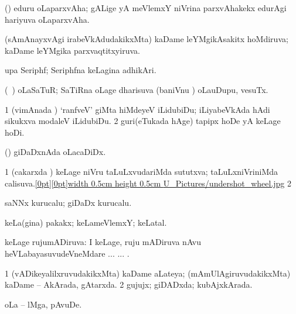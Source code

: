 {\bentry
{} 
\gl{\nA}
\expl{}
\bmng
 (\nw) eduru oLaparxvAha; gALige yA meVlemxY niVrina parxvAhakekx edurAgi hariyuva oLaparxvAha. 
\emng
\eentry

\bentry
{} 
\gl{\gu}
\expl{}
\bmng
 (sAmAnayxvAgi irabeVkAdudakikxMta) kaDame leYMgikAsakitx hoMdiruva; kaDame leYMgika parxvaqtitxyiruva. 
\emng
\eentry

\bentry
{} 
\gl{\nA}
\expl{}
\bmng
 upa Seriphf; Seriphfna keLagina adhikAri. 
\emng
\eentry

\bentry
{} 
\gl{\gu}
\expl{}
\bmng
 (\kanmu\ \ame) oLaSaTuR; SaTiRna oLage dharisuva (baniVnu \mo) oLauDupu, vesuTx. 
\emng
\eentry

\bentry
{} 
\gl{\sakirx}
\expl{}
\bmng
\bnum
\num{1} (vimAnada \vi) `ranfveV' giMta hiMdeyeV iLidubiDu; iLiyabeVkAda hAdi sikukxva modaleV iLidubiDu. 
\num{2} guri(eTukada hAge) tapipx hoDe yA keLage hoDi. 
\enum
\emng
\eentry


\bentry
{} 
\gl{\nA}
\expl{}
\bmng
(\ame) giDaDxnAda oLacaDiDx. 
\emng
\eentry

\bentry
{} 	
\gl{\gu}
\expl{}
\bmng
\bnum
\num{1} (cakarxda \vi) keLage niVru taLuLxvudariMda sututxva; taLuLxniVriniMda calisuva.\quad\hyperlink{undershot_wheelfigure}{\raisebox{-0.15cm}[0pt][0pt]{\pdfimage width 0.5cm height 0.5cm {U_Pictures/undershot_wheel.jpg}}} 
\num{2}  
\enum
\emng
\eentry

\bentry
{} 
\gl{\nA}
\expl{}
\bmng
 saNNx kurucalu; giDaDx kurucalu. 
\emng
\eentry

\bentry
{} 
\gl{\nA}
\expl{}
\bmng
 keLa(gina) pakakx; keLameVlemxY; keLatal. 
\emng
\eentry

\bentry
{} 
\gl{\gu}
\expl{}
\bmng
 keLage rujumADiruva:  I keLage, ruju mADiruva nAvu heVLabayasuvudeVneMdare ... ... . 
\emng
\eentry

\bentry
{} 
\gl{\gu}
\expl{}
\bmng
\bnum
\num{1} (vADikeyalilxruvudakikxMta) kaDame aLateya; (mAmUlAgiruvudakikxMta) kaDame -- AkArada, gAtarxda. 
\num{2} gujujx; giDADxda; kubAjxkArada. 
\enum
\emng
\eentry

\bentry
{} 
\gl{\nA}
\expl{}
\bmng
 oLa -- lMga, pAvuDe. 
\emng
\eentry

}
